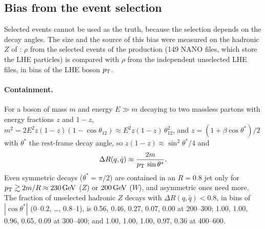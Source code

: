 \subsection{Bias from the event selection}
\label{app:truth:bias}
Selected events cannot be used as the truth, because the selection depends on the decay angles. The size and the
source of this bias were measured on the hadronic $Z$ of : $\rho$ from the selected events of the
production  (149 NANO files, which store the LHE particles) is compared with $\rho$ from the
independent unselected LHE files, in bins of the LHE boson $p_{\mathrm{T}}$.

\paragraph{Containment.} For a boson of mass $m$ and energy $E \gg m$ decaying to two massless partons with energy
fractions $z$ and $1-z$, $m^2 = 2E^2 z(1-z)(1-\cos\theta_{12}) \approx E^2 z(1-z)\,\theta_{12}^2$, and
$z = (1 + \beta\cos\theta^*)/2$ with $\theta^*$ the rest-frame decay angle, so $z(1-z) \approx \sin^2\theta^*/4$ and
\begin{equation}
  \Delta R(q,\bar q) \approx \frac{2m}{p_{\mathrm{T}}\,\sin\theta^*}.
  \label{eq:app:containment}
\end{equation}
Even symmetric decays ($\theta^* = \pi/2$) are contained in an $R = 0.8$ jet only for $p_{\mathrm{T}} \gtrsim 2m/R \approx
230\,\mathrm{GeV}$ ($Z$) or $200\,\mathrm{GeV}$ ($W$), and asymmetric ones need more. The fraction of unselected hadronic $Z$ decays with
$\Delta R(q,\bar q) < 0.8$, in bins of $|\cos\theta^*|$ (0--0.2, \ldots, 0.8--1), is 0.56, 0.46, 0.27, 0.07, 0.00 at
200--300\GeV; 1.00, 1.00, 0.96, 0.65, 0.09 at 300--400\GeV; and 1.00, 1.00, 1.00, 0.97, 0.36 at 400--600\GeV.

